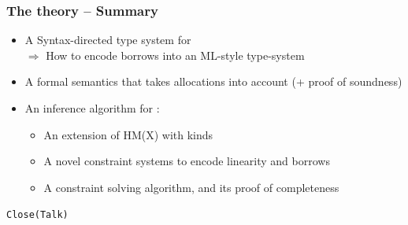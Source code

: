\documentclass[aspectratio=169,dvipsnames,svgnames,10pt]{beamer}
\begin{document}
\begin{frame}
  \frametitle{The theory -- Summary}

  \begin{itemize}
  \item A Syntax-directed type system for \lang\\
    $\Rightarrow$ How to encode borrows into an ML-style type-system
  \item A formal semantics that takes allocations into account (+ proof of soundness)
  \item An inference algorithm for \lang:
    \begin{itemize}
    \item An extension of HM(X) with kinds
    \item A novel constraint systems to encode linearity and borrows
    \item A constraint solving algorithm, and its proof of completeness
    \end{itemize}
  \end{itemize}
\end{frame}

\begin{frame}[standout]

  \centering\Huge\texttt{Close(Talk)}
  
\end{frame}

% 
\end{document}
